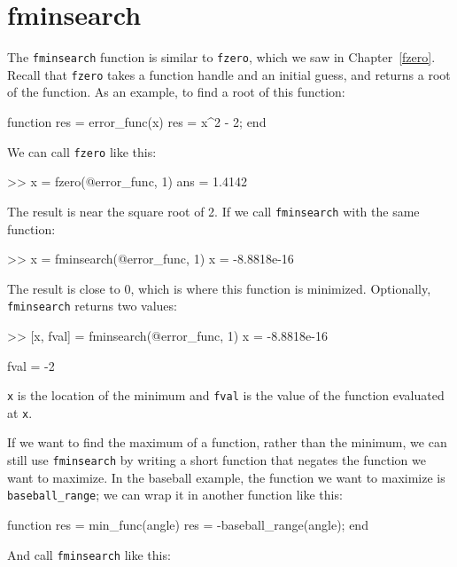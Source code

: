 \section{fminsearch}

The {\tt fminsearch} function is similar to {\tt fzero}, which we saw in Chapter~\ref{fzero}.  Recall that {\tt fzero} takes a function handle and an initial guess, and returns a root of the function.
As an example, to find a root of this function:


\begin{code}
function res = error_func(x)
    res = x^2 - 2;
end
\end{code}

We can call {\tt fzero} like this:

\begin{code}
>> x = fzero(@error_func, 1)
ans = 1.4142
\end{code}

The result is near the square root of 2.  If we call {\tt fminsearch} with the same function:

\begin{code}
>> x = fminsearch(@error_func, 1)
x = -8.8818e-16
\end{code}

The result is close to 0, which is where this function is minimized.  Optionally, {\tt fminsearch} returns two values:

\begin{code}
>> [x, fval] = fminsearch(@error_func, 1)
x = -8.8818e-16

fval = -2
\end{code}

{\tt x} is the location of the minimum and {\tt fval} is the value of the function evaluated at {\tt x}.

If we want to find the maximum of a function, rather than the minimum, we can still use {\tt fminsearch} by writing a short function that negates the function we want to maximize.
In the baseball example, the function we want to maximize is \verb"baseball_range"; we can wrap it in another function like this:

\begin{code}
function res = min_func(angle)
    res = -baseball_range(angle);
end
\end{code}

And call {\tt fminsearch} like this:

